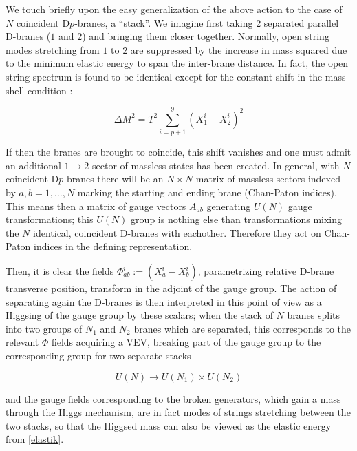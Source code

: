 \label{sec:branestacks}

We touch briefly upon the easy generalization of the above action to the case of $N$ coincident D$p$-branes, a ``stack''. We imagine first taking $2$ separated parallel D-branes ($1$ and $2$) and bringing them closer together. Normally, open string modes stretching from $1$ to $2$ are suppressed by the increase in mass squared due to the minimum elastic energy to span the inter-brane distance. In fact, the open string spectrum is found to be identical except for the constant shift in the mass-shell condition \cite{BBS}:

\begin{equation}
	\Delta M^2 = T^2 \sum_{i=p+1}^9 (X^i_1 - X^i_2)^2
	\label{elastik}
\end{equation}

If then the branes are brought to coincide, this shift vanishes and one must admit an additional $1\rightarrow2$ sector of massless states has been created. In general, with $N$ coincident D$p$-branes there will be an $N\times N$ matrix of massless sectors indexed by $a,b = 1,\ldots,N$ marking the starting and ending brane (Chan-Paton indices). This means then a matrix of gauge vectors $A_{ab}$ generating $U(N)$ gauge transformations; this $U(N)$ group is nothing else than transformations mixing the $N$ identical, coincident D-branes with eachother. Therefore they act on Chan-Paton indices in the defining representation.

Then, it is clear the fields $\Phi_{ab}^i := (X_a^i - X_b^i)$, parametrizing relative D-brane transverse position, transform in the adjoint of the gauge group. The action of separating again the D-branes is then interpreted in this point of view as a Higgsing of the gauge group by these scalars; when the stack of $N$ branes splits into two groups of $N_1$ and $N_2$ branes which are separated, this corresponds to the relevant $\Phi$ fields acquiring a VEV, breaking part of the gauge group to the corresponding group for two separate stacks

\begin{equation}
	U(N) \rightarrow U(N_1) \times U(N_2)
	\label{}
\end{equation}

and the gauge fields corresponding to the broken generators, which gain a mass through the Higgs mechanism, are in fact modes of strings stretching between the two stacks, so that the Higgsed mass can also be viewed as the elastic energy from \eqref{elastik}.


